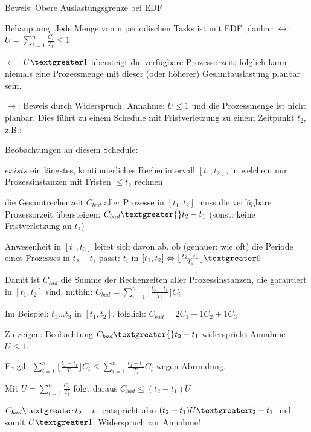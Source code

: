 \documentclass[a4paper]{article}
\begin{document}
\begin{multicols}{3}
\begin{itemize*}
\begin{itemize*}
        \end{itemize*}
        \item Beweis: Obere Auslastungsgrenze bei EDF
        \begin{itemize*}
            \item Behauptung: Jede Menge von n periodischen Tasks ist mit EDF planbar $\leftrightarrow$: $U=\sum_{i=1}^n \frac{C_i}{T_i}\leq 1$
            \item $\leftarrow$: $U\textgreater1$ übersteigt die verfügbare Prozessorzeit; folglich kann niemals eine Prozessmenge mit dieser (oder höherer) Gesamtauslastung planbar sein.
            \item $\rightarrow$: Beweis durch Widerspruch. Annahme: $U\leq 1$ und die Prozessmenge ist nicht planbar. Dies führt zu einem Schedule mit Fristverletzung zu einem Zeitpunkt $t_2$, z.B.:
            \item Beobachtungen an diesem Schedule:
            \begin{itemize*}
                \item $exists$ ein längstes, kontinuierliches Rechenintervall $[t_1,t_2]$, in welchem nur Prozessinstanzen mit Fristen $\leq t_2$ rechnen
                \item die Gesamtrechenzeit $C_{bad}$ aller Prozesse in $[t_1,t_2]$ muss die verfügbare Prozessorzeit übersteigen: $C_{bad} \textgreater{} t_2-t_1$ (sonst: keine Fristverletzung an $t_2$)
                \item Anwesenheit in $[t_1,t_2]$ leitet sich davon ab, ob (genauer: wie oft) die Periode eines Prozesses in $t_2-t_1$ passt: $t_i$ in $[t_1,t_2]\Leftrightarrow\lfloor\frac{t_2-t_1}{T_i}\rfloor \textgreater0$
                \item Damit ist $C_{bad}$ die Summe der Rechenzeiten aller Prozessinstanzen, die garantiert in $[t_1,t_2]$ sind, mithin: $C_{bad}=\sum_{i=1}^n \lfloor\frac{t_2-t_1}{T_i}\rfloor C_i$
                \item Im Beispiel: $t_1... t_3$ in $[t_1,t_2]$, folglich: $C_{bad}= 2 C_1 + 1 C_2 + 1 C_3$
                \item Zu zeigen: Beobachtung $C_{bad}\textgreater{} t_2-t_1$ widerspricht Annahme $U\leq 1$.
                \item Es gilt $\sum_{i=1}^n \lfloor\frac{t_2-t_1}{T_i}\rfloor C_i\leq\sum_{i=1}^n\frac{t_2-t_1}{T_i}C_i$ wegen Abrundung.
                \item Mit $U=\sum_{i=1}^n \frac{C_i}{T_i}$ folgt daraus $C_{bad}\leq(t_2-t_1)U$
                \item $C_{bad}\textgreater t_2-t_1$ entspricht also $(t_2-t_1)U\textgreater t_2-t_1$ und somit $U\textgreater1$. Widerspruch zur Annahme!
            \end{itemize*}
        \end{itemize*}
    \end{itemize*}



\end{multicols}
\end{document}
